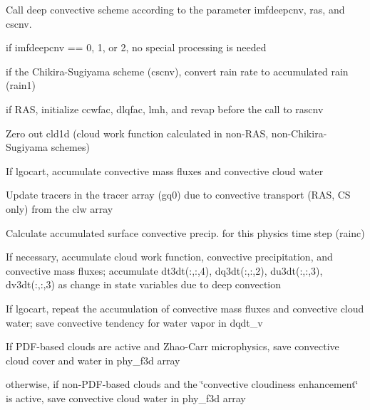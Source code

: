 \begin{DoxyItemize}
\item Call deep convective scheme according to the parameter \textquotesingle{}imfdeepcnv\textquotesingle{}, \textquotesingle{}ras\textquotesingle{}, and \textquotesingle{}cscnv\textquotesingle{}.
\begin{DoxyItemize}
\item if imfdeepcnv == 0, 1, or 2, no special processing is needed
\item if the Chikira-\/\+Sugiyama scheme (cscnv), convert rain rate to accumulated rain (rain1)
\item if R\+AS, initialize \textquotesingle{}ccwfac\textquotesingle{}, \textquotesingle{}dlqfac\textquotesingle{}, \textquotesingle{}lmh\textquotesingle{}, and revap before the call to \textquotesingle{}rascnv\textquotesingle{}
\end{DoxyItemize}
\item Zero out \textquotesingle{}cld1d\textquotesingle{} (cloud work function calculated in non-\/\+R\+AS, non-\/\+Chikira-\/\+Sugiyama schemes)
\item If \textquotesingle{}lgocart\textquotesingle{}, accumulate convective mass fluxes and convective cloud water
\item Update tracers in the tracer array (gq0) due to convective transport (R\+AS, CS only) from the \textquotesingle{}clw\textquotesingle{} array
\item Calculate accumulated surface convective precip. for this physics time step (rainc)
\item If necessary, accumulate cloud work function, convective precipitation, and convective mass fluxes; accumulate dt3dt(\+:,\+:,4), dq3dt(\+:,\+:,2), du3dt(\+:,\+:,3), dv3dt(\+:,\+:,3) as change in state variables due to deep convection
\item If \textquotesingle{}lgocart\textquotesingle{}, repeat the accumulation of convective mass fluxes and convective cloud water; save convective tendency for water vapor in \textquotesingle{}dqdt\+\_\+v\textquotesingle{}
\item If P\+D\+F-\/based clouds are active and Zhao-\/\+Carr microphysics, save convective cloud cover and water in \textquotesingle{}phy\+\_\+f3d\textquotesingle{} array
\begin{DoxyItemize}
\item otherwise, if non-\/\+P\+D\+F-\/based clouds and the \char`\"{}convective cloudiness enhancement\char`\"{} is active, save convective cloud water in \textquotesingle{}phy\+\_\+f3d\textquotesingle{} array
\end{DoxyItemize}
\end{DoxyItemize}

